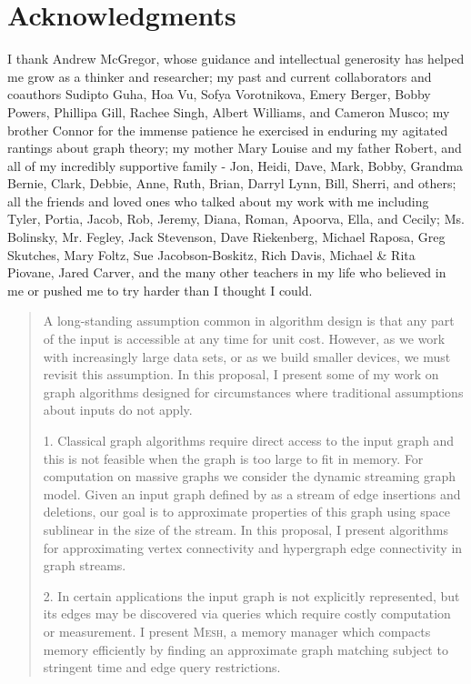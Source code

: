 \documentclass[proposal,singlespace]{umassthesis}          %
\newcommand{\Mesh}{\textsc{Mesh}\xspace}
\begin{document}
\chapter{Acknowledgments}             %
  I thank Andrew McGregor, whose guidance and intellectual generosity has helped me grow as a thinker and researcher; my past and current collaborators and coauthors Sudipto Guha, Hoa Vu, Sofya Vorotnikova, Emery Berger, Bobby Powers, Phillipa Gill, Rachee Singh, Albert Williams, and Cameron Musco; my brother Connor for the immense patience he exercised in enduring my agitated rantings about graph theory; my mother Mary Louise and my father Robert, and all of my incredibly supportive family - Jon, Heidi, Dave, Mark, Bobby, Grandma Bernie, Clark, Debbie, Anne, Ruth, Brian, Darryl Lynn, Bill, Sherri, and others; all the friends and loved ones who talked about my work with me including Tyler, Portia, Jacob, Rob, Jeremy, Diana, Roman, Apoorva, Ella, and Cecily; Ms. Bolinsky, Mr. Fegley, Jack Stevenson, Dave Riekenberg, Michael Raposa, Greg Skutches, Mary Foltz, Sue Jacobson-Boskitz, Rich Davis, Michael \& Rita Piovane, Jared Carver, and the many other teachers in my life who believed in me or pushed me to try harder than I thought I could.
\fi



\begin{abstract}                %

  A long-standing assumption common in algorithm design is that any part of the input is accessible at any time for unit cost.  However, as we work with increasingly large data sets, or as we build smaller devices, we must revisit this assumption.  In this proposal, I present some of my work on graph algorithms designed for circumstances where traditional assumptions about inputs do not apply.

1. Classical graph algorithms require direct access to the input graph and this is not feasible when the graph is too large to fit in memory.  For computation on massive graphs we consider the dynamic streaming graph model.  Given an input graph defined by as a stream of edge insertions and deletions, our goal is to approximate properties of this graph using space sublinear in the size of the stream.  In this proposal, I present algorithms for approximating vertex connectivity and hypergraph edge connectivity in graph streams.

2. In certain applications the input graph is not explicitly represented, but its edges may be discovered via queries which require costly computation or measurement.  I present \Mesh, a memory manager which compacts memory efficiently by finding an approximate graph matching subject to stringent time and edge query restrictions.

\end{abstract}
\end{document}
